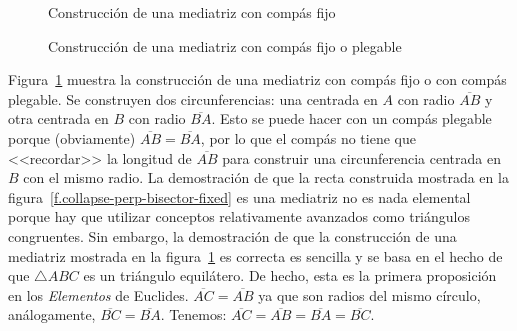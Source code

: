 \begin{figure}[t]
\begin{minipage}{.45\textwidth}
\begin{center}
\caption{Construcción de una mediatriz con compás fijo}\label{f.collapse-perp-bisector-fixed}
\end{center}
\end{minipage}
\hfill
\begin{minipage}{.45\textwidth}
\begin{center}
\caption{Construcción de una mediatriz con compás fijo o plegable}\label{f.collapse-perp-bisector-collapse}
\end{center}
\end{minipage}
\end{figure}

Figura~\ref{f.collapse-perp-bisector-collapse} muestra la construcción de una mediatriz con compás fijo o con compás plegable. Se construyen dos circunferencias: una centrada en $A$ con radio $\overline{AB}$ y otra centrada en $B$ con radio $\overline{BA}$. Esto se puede hacer con un compás plegable porque (obviamente) $\overline{AB}=\overline{BA}$, por lo que el compás no tiene que <<recordar>> la longitud de $\overline{AB}$ para construir una circunferencia centrada en $B$ con el mismo radio.
La demostración de que la recta construida mostrada en la figura~\ref{f.collapse-perp-bisector-fixed} es una mediatriz no es nada elemental porque hay que utilizar conceptos relativamente avanzados como triángulos congruentes. Sin embargo, la demostración de que la construcción de una mediatriz mostrada en la figura~\ref{f.collapse-perp-bisector-collapse} es correcta es sencilla y se basa en el hecho de que $\triangle ABC$ es un triángulo equilátero. De hecho, esta es la primera proposición en los \textit{Elementos} de Euclides.
$\overline{AC}=\overline{AB}$ ya que son radios del mismo círculo, análogamente, $\overline{BC}=\overline{BA}$. Tenemos: $\overline{AC}=\overline{AB}=\overline{BA}=\overline{BC}$.

